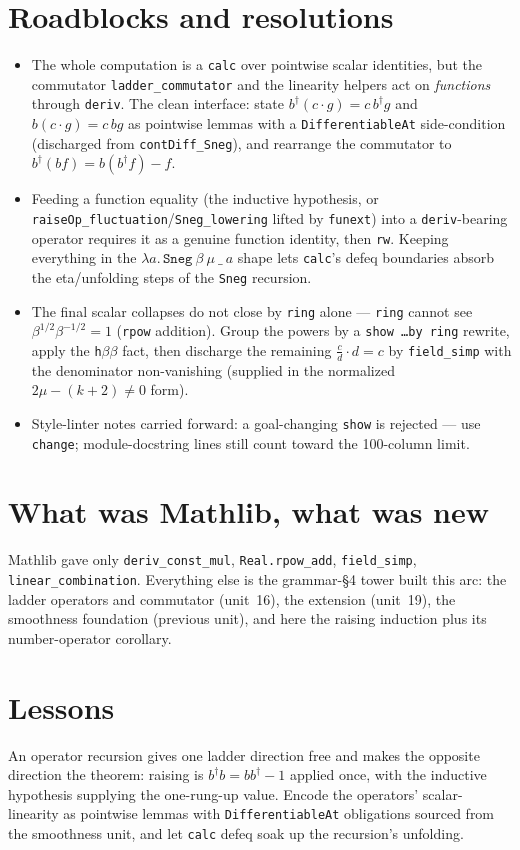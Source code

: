 \documentclass[11pt]{article}
\begin{document}
\section{Roadblocks and resolutions}
\begin{itemize}
\item The whole computation is a \texttt{calc} over pointwise scalar identities, but the commutator
\texttt{ladder\_commutator} and the linearity helpers act on \emph{functions} through \texttt{deriv}.
The clean interface: state $b^\dagger(c\cdot g)=c\,b^\dagger g$ and $b(c\cdot g)=c\,bg$ as pointwise
lemmas with a \texttt{DifferentiableAt} side-condition (discharged from \texttt{contDiff\_Sneg}),
and rearrange the commutator to $b^\dagger(bf)=b(b^\dagger f)-f$.
\item Feeding a function equality (the inductive hypothesis, or
\texttt{raiseOp\_fluctuation}/\texttt{Sneg\_lowering} lifted by \texttt{funext}) into a
\texttt{deriv}-bearing operator requires it as a genuine function identity, then \texttt{rw}. Keeping
everything in the $\lambda a.\,\texttt{Sneg}\ \beta\ \mu\ \_\ a$ shape lets \texttt{calc}'s defeq
boundaries absorb the eta/unfolding steps of the \texttt{Sneg} recursion.
\item The final scalar collapses do not close by \texttt{ring} alone --- \texttt{ring} cannot see
$\beta^{1/2}\beta^{-1/2}=1$ (\texttt{rpow} addition). Group the powers by a \texttt{show \dots by ring}
rewrite, apply the \texttt{h}$\beta\beta$ fact, then discharge the remaining
$\tfrac{c}{d}\cdot d=c$ by \texttt{field\_simp} with the denominator non-vanishing (supplied in the
normalized $2\mu-(k{+}2)\ne0$ form).
\item Style-linter notes carried forward: a goal-changing \texttt{show} is rejected --- use
\texttt{change}; module-docstring lines still count toward the 100-column limit.
\end{itemize}

\section{What was Mathlib, what was new}
Mathlib gave only \texttt{deriv\_const\_mul}, \texttt{Real.rpow\_add}, \texttt{field\_simp},
\texttt{linear\_combination}. Everything else is the grammar-\S4 tower built this arc: the ladder
operators and commutator (unit~16), the extension (unit~19), the smoothness foundation (previous
unit), and here the raising induction plus its number-operator corollary.

\section{Lessons}
An operator recursion gives one ladder direction free and makes the opposite direction the theorem:
raising is $b^\dagger b=bb^\dagger-1$ applied once, with the inductive hypothesis supplying the
one-rung-up value. Encode the operators' scalar-linearity as pointwise lemmas with
\texttt{DifferentiableAt} obligations sourced from the smoothness unit, and let \texttt{calc} defeq
soak up the recursion's unfolding.
\end{document}

